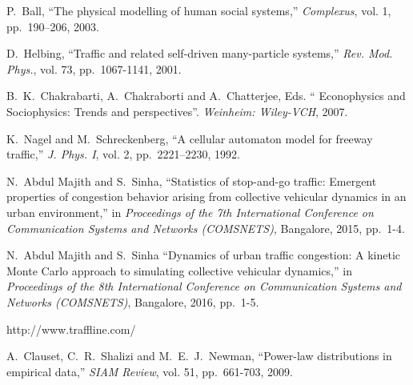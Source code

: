 \documentclass[conference]{IEEEtran}
\begin{document}
\begin{thebibliography}{1}
{P.~Ball, ``The physical modelling of human social systems,'' {\em
Complexus}, vol. 1, pp.~190–206, 2003.}

{D.~Helbing, ``Traffic and related self-driven many-particle
systems,'' {\em Rev. Mod. Phys.}, vol. 73, pp.~1067-1141, 2001.}

{B.~K.~Chakrabarti, A.~Chakraborti and A.~Chatterjee, Eds. ``
Econophysics and Sociophysics: Trends and perspectives''. 
{\em Weinheim: Wiley-VCH}, 2007.}

{K.~Nagel and M.~Schreckenberg, ``A cellular automaton model
for freeway traffic,'' {\em J. Phys. I}, vol. 2, pp.~2221–2230, 1992.}

{N.~Abdul Majith and S.~Sinha, ``Statistics of stop-and-go traffic: Emergent properties of congestion 
behavior arising from collective vehicular dynamics in an urban environment,'' in {\em Proceedings of the 
7th International Conference on Communication Systems and Networks (COMSNETS)}, Bangalore, 2015, pp.~1-4.}

{N.~Abdul Majith and S.~Sinha ``Dynamics of urban traffic congestion: A kinetic Monte Carlo
approach to simulating collective vehicular dynamics,'' in
{\em Proceedings of the
8th International Conference on Communication Systems and Networks
(COMSNETS)}, Bangalore, 2016, pp.~1-5.}

http://www.traffline.com/

{A.~Clauset, C.~R.~Shalizi and M.~E.~J.~Newman, ``Power-law distributions 
in empirical data,'' {\em SIAM Review}, vol. 51, pp.~661-703, 2009.}





\end{thebibliography}


\end{document}
